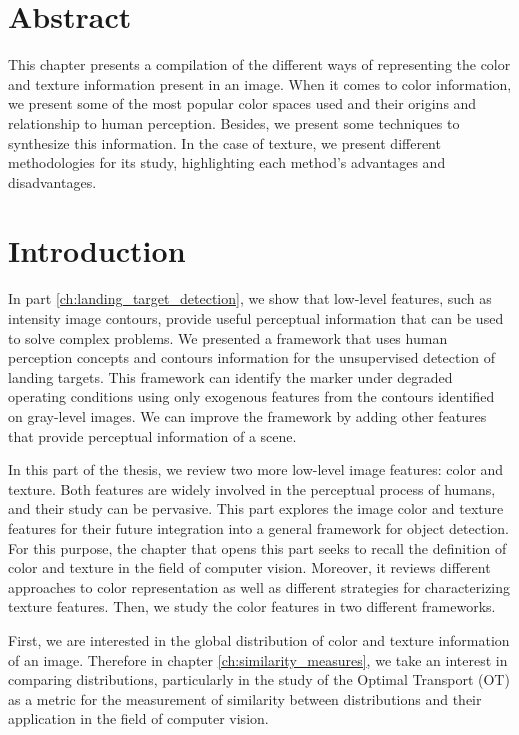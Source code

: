 \section*{Abstract}
\noindent 
This chapter presents a compilation of the different ways of representing the color and texture information present in an image. When it comes to color information, we present some of the most popular color spaces used and their origins and relationship to human perception. Besides, we present some techniques to synthesize this information. In the case of texture, we present different methodologies for its study, highlighting each method's advantages and disadvantages.

\section{Introduction}
In part \ref{ch:landing_target_detection}, we show that low-level features, such as intensity image contours, provide useful perceptual information that can be used to solve complex problems. We presented a framework that uses human perception concepts and contours information for the unsupervised detection of landing targets. This framework can identify the marker under degraded operating conditions using only exogenous features from the contours identified on gray-level images. We can improve the framework by adding other features that provide perceptual information of a scene.

In this part of the thesis, we review two more low-level image features: color and texture. Both features are widely involved in the perceptual process of humans, and their study can be pervasive. This part explores the image color and texture features for their future integration into a general framework for object detection. For this purpose, the chapter that opens this part seeks to recall the definition of color and texture in the field of computer vision. Moreover, it reviews different approaches to color representation as well as different strategies for characterizing texture features. Then, we study the color features in two different frameworks.

First, we are interested in the global distribution of color and texture information of an image. Therefore in chapter \ref{ch:similarity_measures}, we take an interest in comparing distributions, particularly in the study of the Optimal Transport (OT) as a metric for the measurement of similarity between distributions and their application in the field of computer vision.

